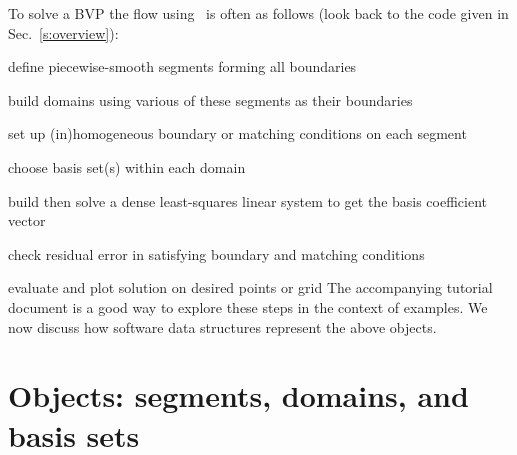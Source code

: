 \documentclass[12pt]{article}
\begin{document}
To solve a BVP the flow using \mpspack\ is often as follows
(look back to the code given in Sec.~\ref{s:overview}):
\ben
\item define piecewise-smooth segments forming all boundaries
\item build domains using various of these segments as their boundaries
\item set up (in)homogeneous boundary or matching conditions on each segment
\item choose basis set(s) within each domain
\item build then solve a dense least-squares
linear system to get the basis coefficient vector
\item check residual error in satisfying boundary and matching conditions
\item evaluate and plot solution on desired points or grid
\een
The accompanying
tutorial document is a good way to explore these steps
in the context of examples.
We now discuss how software data structures represent the above objects.



\bfi %
\efi


\section{Objects: segments, domains, and basis sets}
\end{document}
